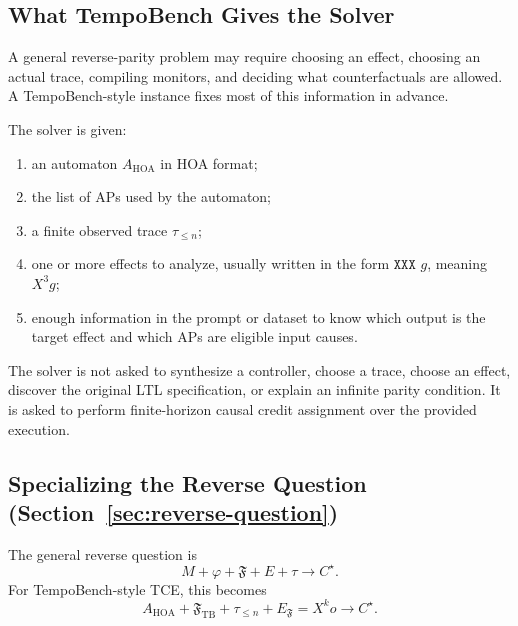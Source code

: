 \documentclass[11pt]{article}
\theoremstyle{remark}
\newcommand{\Frame}{\mathfrak{F}}
\begin{document}
\subsection{What TempoBench Gives the Solver}

A general reverse-parity problem may require choosing an effect, choosing an
actual trace, compiling monitors, and deciding what counterfactuals are allowed.
A TempoBench-style instance fixes most of this information in advance.

The solver is given:
\begin{enumerate}[label=\arabic*.]
  \item an automaton \(A_{\mathrm{HOA}}\) in HOA format;
  \item the list of APs used by the automaton;
  \item a finite observed trace \(\tau_{\le n}\);
  \item one or more effects to analyze, usually written in the form
        \(\texttt{XXX }g\), meaning \(X^3 g\);
  \item enough information in the prompt or dataset to know which output is the
        target effect and which APs are eligible input causes.
\end{enumerate}

The solver is not asked to synthesize a controller, choose a trace, choose an
effect, discover the original LTL specification, or explain an infinite parity
condition. It is asked to perform finite-horizon causal credit assignment over
the provided execution.

\subsection{Specializing the Reverse Question (Section~\ref{sec:reverse-question})}

The general reverse question is
\[
  M+\varphi+\Frame+E+\tau
  \longrightarrow
  C^\star .
\]
For TempoBench-style TCE, this becomes
\[
  A_{\mathrm{HOA}}
  +
  \Frame_{\mathrm{TB}}
  +
  \tau_{\le n}
  +
  E_{\Frame}=X^k o
  \longrightarrow
  C^\star .
\]
\end{document}
